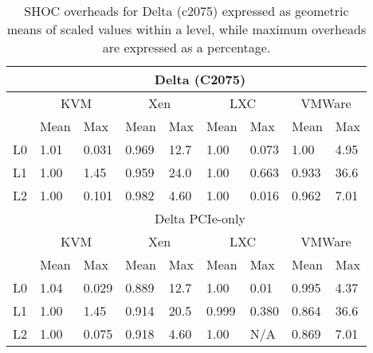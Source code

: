 \begin{table*}
\footnotesize
\caption{SHOC overheads  for Delta (c2075) expressed as geometric means of scaled values within a
level, while maximum overheads are expressed as a percentage.  }
\label{C2075MEANS}
\centering
    \begin{tabular}{|l|l|l|l|l|l|l|l|l|}
    \hline 
    ~  &  \multicolumn{8}{c|}{Delta (C2075)} \\ \hline
    ~  & \multicolumn{2}{c|}{KVM} & \multicolumn{2}{c|}{Xen} & \multicolumn{2}{c|}{LXC} & \multicolumn{2}{c|}{VMWare}  \\ \hline 
    ~  & Mean   & Max & Mean & Max & Mean & Max & Mean & Max \\ \hline 
    L0 & 1.01     & 0.031   & 0.969    & 12.7  & 1.00  & 0.073   & 1.00  & 4.95    \\ \hline 
    L1 & 1.00     & 1.45    & 0.959    & 24.0  & 1.00  & 0.663   & 0.933 & 36.6    \\ \hline 
    L2 & 1.00     & 0.101   & 0.982    & 4.60  & 1.00  & 0.016   & 0.962 & 7.01    \\ \hline
    ~  &  \multicolumn{8}{c|}{Delta PCIe-only} \\ \hline
    ~  & \multicolumn{2}{c|}{KVM} & \multicolumn{2}{c|}{Xen} & \multicolumn{2}{c|}{LXC} & \multicolumn{2}{c|}{VMWare} \\ \hline 
    ~  & Mean   & Max & Mean & Max & Mean & Max & Mean & Max \\ \hline 
    L0 & 1.04     & 0.029   & 0.889    & 12.7  & 1.00  & 0.01  & 0.995  & 4.37    \\ \hline 
    L1 & 1.00     & 1.45    & 0.914    & 20.5  & 0.999 & 0.380 & 0.864  & 36.6    \\ \hline 
    L2 & 1.00     & 0.075   & 0.918    & 4.60  & 1.00  & N/A   & 0.869  & 7.01    \\ \hline
    \end{tabular}
\end{table*}



